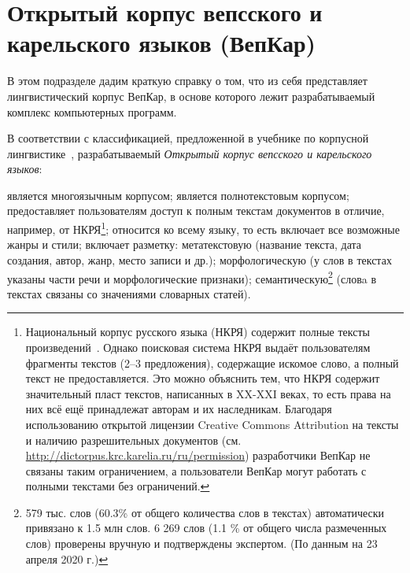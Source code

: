 
\section{Открытый корпус вепсского и карельского языков (ВепКар)} \label{sect_VepKar_about}

В этом подразделе дадим краткую справку о том, что из себя представляет 
лингвистический корпус ВепКар, в основе которого лежит 
разрабатываемый комплекс компьютерных программ.

В соответствии с классификацией, предложенной 
в учебнике по корпусной лингвистике~\cite[с.~12]{Zakharov2005}, 
разрабатываемый \emph{Открытый корпус вепсского и карельского языков}: 
\renewcommand{\outlinei}{itemize}
\renewcommand{\outlineii}{itemize}
\begin{outline}
    \1 является многоязычным корпусом;
    \1 является полнотекстовым корпусом;
    \1 предоставляет пользователям доступ к полным текстам документов в отличие, 
    например, от НКРЯ\footnote{Национальный 
    корпус русского языка (НКРЯ) содержит 
        полные тексты произведений~\cite[с.~12]{Plungyan2004Sichinava}.  
        Однако поисковая система НКРЯ выдаёт пользователям фрагменты текстов (2--3 предложения), 
        содержащие искомое слово, а полный текст не предоставляется. 
        Это можно объяснить тем, что НКРЯ содержит значительный пласт текстов, 
        написанных в XX-XXI веках, 
        то есть права на них всё ещё принадлежат авторам и их наследникам. 
        Благодаря использованию открытой лицензии Creative Commons Attribution на тексты 
        и наличию разрешительных документов
        (см. \url{http://dictorpus.krc.karelia.ru/ru/permission}) 
        разработчики ВепКар не связаны таким ограничением,  
        а пользователи ВепКар могут работать с полными текстами без ограничений.
    };
    \1 относится ко всему языку, то есть включает все возможные жанры и стили; 
    \1 включает разметку:
        \2[\textbullet] метатекстовую (название текста, дата создания, автор, жанр, место записи и др.);
        \2[\textbullet] морфологическую (у слов в текстах указаны части речи и морфологические признаки);
        \2[\textbullet] семантическую\footnote{ 579 тыс. слов (60.3\% от общего количества слов в
         	             текстах) автоматически привязано к 1.5 млн  слов. 6 269 слов (1.1 \% от общего числа размеченных слов) 
         	             проверены вручную и подтверждены экспертом.
                        (По данным на 23 апреля 2020 г.)} (словa в текстах связаны со значениями словарных статей).
\end{outline}

